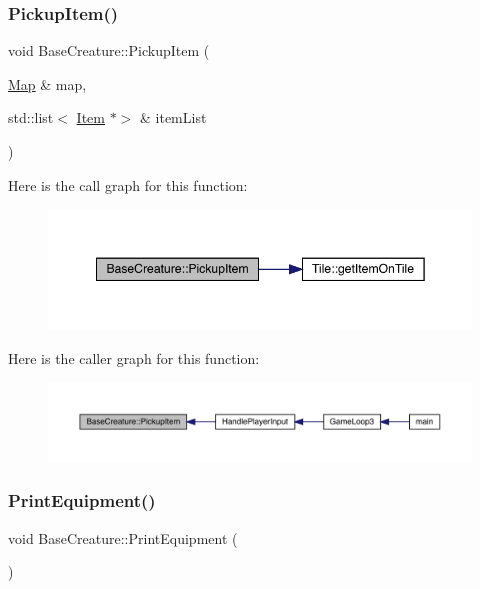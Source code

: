 \subsubsection{\texorpdfstring{Pickup\+Item()}{PickupItem()}}
{\footnotesize\ttfamily void Base\+Creature\+::\+Pickup\+Item (\begin{DoxyParamCaption}\item[{\mbox{\hyperlink{class_map}{Map}} \&}]{map,  }\item[{std\+::list$<$ \mbox{\hyperlink{class_item}{Item}} $\ast$$>$ \&}]{item\+List }\end{DoxyParamCaption})}

Here is the call graph for this function\+:
\nopagebreak
\begin{figure}[H]
\begin{center}
\leavevmode
\includegraphics[width=348pt]{d2/d3b/class_base_creature_a2d45724079ff2eeb6606b222e405e4a8_cgraph}
\end{center}
\end{figure}
Here is the caller graph for this function\+:
\nopagebreak
\begin{figure}[H]
\begin{center}
\leavevmode
\includegraphics[width=350pt]{d2/d3b/class_base_creature_a2d45724079ff2eeb6606b222e405e4a8_icgraph}
\end{center}
\end{figure}
\mbox{\label{class_base_creature_ac3d7907a8d8e0967a5881ff180205028}} 
\subsubsection{\texorpdfstring{Print\+Equipment()}{PrintEquipment()}}
{\footnotesize\ttfamily void Base\+Creature\+::\+Print\+Equipment (\begin{DoxyParamCaption}{ }\end{DoxyParamCaption})}

